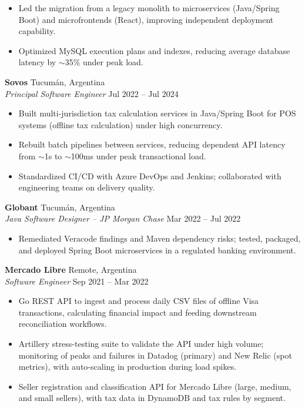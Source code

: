 \documentclass[11pt]{article}
\newcommand{\jobsep}{\vspace{8pt}}
\begin{document}
\begin{itemize}
    \item Led the migration from a legacy monolith to microservices (Java/Spring Boot) and microfrontends (React), improving independent deployment capability.
    \item Optimized MySQL execution plans and indexes, reducing average database latency by $\sim$35\% under peak load.
\end{itemize}

\jobsep

\textbf{Sovos} \hfill Tucumán, Argentina\\
\textit{Principal Software Engineer} \hfill Jul 2022 -- Jul 2024

\begin{itemize}
    \item Built multi-jurisdiction tax calculation services in Java/Spring Boot for POS systems (offline tax calculation) under high concurrency.
    \item Rebuilt batch pipelines between services, reducing dependent API latency from $\sim$1s to $\sim$100ms under peak transactional load.
    \item Standardized CI/CD with Azure DevOps and Jenkins; collaborated with engineering teams on delivery quality.
\end{itemize}

\jobsep

\textbf{Globant} \hfill Tucumán, Argentina\\
\textit{Java Software Designer -- JP Morgan Chase} \hfill Mar 2022 -- Jul 2022

\begin{itemize}
    \item Remediated Veracode findings and Maven dependency risks; tested, packaged, and deployed Spring Boot microservices in a regulated banking environment.
\end{itemize}

\jobsep

\textbf{Mercado Libre} \hfill Remote, Argentina\\
\textit{Software Engineer} \hfill Sep 2021 -- Mar 2022

\begin{itemize}
    \item Go REST API to ingest and process daily CSV files of offline Visa transactions, calculating financial impact and feeding downstream reconciliation workflows.
    \item Artillery stress-testing suite to validate the API under high volume; monitoring of peaks and failures in Datadog (primary) and New Relic (spot metrics), with auto-scaling in production during load spikes.
    \item Seller registration and classification API for Mercado Libre (large, medium, and small sellers), with tax data in DynamoDB and tax rules by segment.
\end{itemize}
\end{document}
